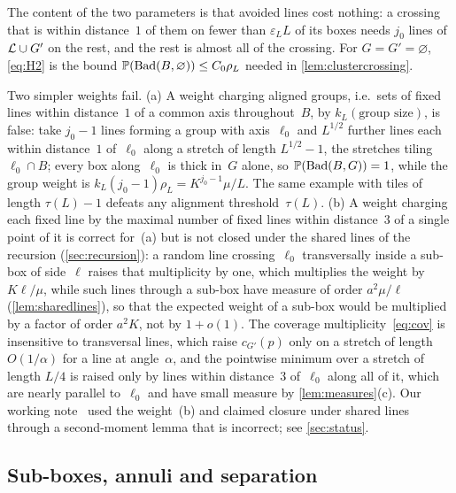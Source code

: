 \documentclass[11pt,letterpaper]{article}
\newcommand{\Bad}{\mathrm{Bad}}
\begin{document}
The content of the two parameters is that avoided lines cost nothing: a crossing that is within distance~$1$ of them on fewer than $\varepsilon_LL$ of its boxes needs $j_0$ lines of $\mathcal L\cup G'$ on the rest, and the rest is almost all of the crossing. For $G=G'=\varnothing$, \eqref{eq:H2} is the bound $\P(\Bad(B,\varnothing))\le C_0\rho_L$ needed in \cref{lem:clustercrossing}.

\begin{remark}
\label{rem:tiling}
Two simpler weights fail. (a) A weight charging aligned groups, i.e.\ sets of fixed lines within distance~$1$ of a common axis throughout~$B$, by $k_L(\text{group size})$, is false: take $j_0-1$ lines forming a group with axis~$\ell_0$ and $L^{1/2}$ further lines each within distance~$1$ of~$\ell_0$ along a stretch of length $L^{1/2}-1$, the stretches tiling~$\ell_0\cap B$; every box along~$\ell_0$ is thick in~$G$ alone, so $\P(\Bad(B,G))=1$, while the group weight is $k_L(j_0-1)\rho_L=K^{j_0-1}\mu/L$. The same example with tiles of length $\tau(L)-1$ defeats any alignment threshold~$\tau(L)$. (b) A weight charging each fixed line by the maximal number of fixed lines within distance~$3$ of a single point of it is correct for~(a) but is not closed under the shared lines of the recursion (\cref{sec:recursion}): a random line crossing~$\ell_0$ transversally inside a sub-box of side~$\ell$ raises that multiplicity by one, which multiplies the weight by $K\ell/\mu$, while such lines through a sub-box have measure of order $a^2\mu/\ell$ (\cref{lem:sharedlines}), so that the expected weight of a sub-box would be multiplied by a factor of order $a^2K$, not by $1+o(1)$. The coverage multiplicity~\eqref{eq:cov} is insensitive to transversal lines, which raise $c_{G'}(p)$ only on a stretch of length $O(1/\alpha)$ for a line at angle~$\alpha$, and the pointwise minimum over a stretch of length $L/4$ is raised only by lines within distance~$3$ of~$\ell_0$ along all of it, which are nearly parallel to~$\ell_0$ and have small measure by \cref{lem:measures}(c). Our working note~\cite{MS26} used the weight~(b) and claimed closure under shared lines through a second-moment lemma that is incorrect; see \cref{sec:status}.
\end{remark}

\subsection{Sub-boxes, annuli and separation}
\end{document}
